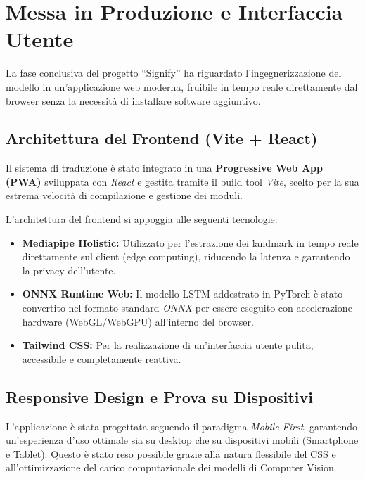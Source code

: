 
\section{Messa in Produzione e Interfaccia Utente}

La fase conclusiva del progetto ``Signify'' ha riguardato l'ingegnerizzazione del modello in un'applicazione web moderna, fruibile in tempo reale direttamente dal browser senza la necessità di installare software aggiuntivo. 

\subsection{Architettura del Frontend (Vite + React)}
Il sistema di traduzione è stato integrato in una \textbf{Progressive Web App (PWA)} sviluppata con \textit{React} e gestita tramite il build tool \textit{Vite}, scelto per la sua estrema velocità di compilazione e gestione dei moduli. 

L'architettura del frontend si appoggia alle seguenti tecnologie:
\begin{itemize}
    \item \textbf{Mediapipe Holistic:} Utilizzato per l'estrazione dei landmark in tempo reale direttamente sul client (edge computing), riducendo la latenza e garantendo la privacy dell'utente.
    \item \textbf{ONNX Runtime Web:} Il modello LSTM addestrato in PyTorch è stato convertito nel formato standard \textit{ONNX} per essere eseguito con accelerazione hardware (WebGL/WebGPU) all'interno del browser.
    \item \textbf{Tailwind CSS:} Per la realizzazione di un'interfaccia utente pulita, accessibile e completamente reattiva.
\end{itemize}

\subsection{Responsive Design e Prova su Dispositivi}
L'applicazione è stata progettata seguendo il paradigma \textit{Mobile-First}, garantendo un'esperienza d'uso ottimale sia su desktop che su dispositivi mobili (Smartphone e Tablet). Questo è stato reso possibile grazie alla natura flessibile del CSS e all'ottimizzazione del carico computazionale dei modelli di Computer Vision.

